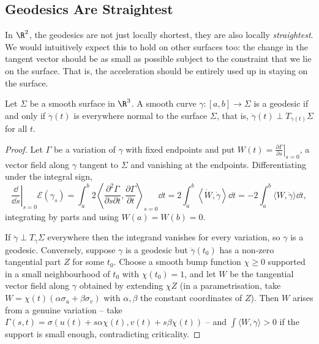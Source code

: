 \subsection{Geodesics Are Straightest}

In $\R^2$, the geodesics are not just locally shortest, they are also locally \emph{straightest}. We would intuitively expect this to hold on other surfaces too: the change in the tangent vector should be as small as possible subject to the constraint that we lie on the surface. That is, the acceleration should be entirely used up in staying on the surface.

\begin{theorem}
    Let $\Sigma$ be a smooth surface in $\R^3$. A smooth curve $\gamma:[a, b] \rightarrow \Sigma$ is a geodesic if and only if $\ddot{\gamma}(t)$ is everywhere normal to the surface $\Sigma$, that is, $\ddot\gamma(t) \perp T_{\gamma(t)}\Sigma$ for all $t$.
\end{theorem}
\begin{proof}
    Let $\Gamma$ be a variation of $\gamma$ with fixed endpoints and put $W(t) = \left.\frac{\partial \Gamma}{\partial s}\right|_{s=0}$, a vector field along $\gamma$ tangent to $\Sigma$ and vanishing at the endpoints. Differentiating under the integral sign,
    $$
    \left.\frac{\dd}{\dd s}\right|_{s=0}\mathcal E(\gamma_s) = \int_a^b 2\left\langle \frac{\partial^2\Gamma}{\partial s \partial t}, \frac{\partial\Gamma}{\partial t}\right\rangle_{s=0} \dd t = 2\int_a^b \left\langle \dot W, \dot\gamma\right\rangle \dd t = -2\int_a^b \langle W, \ddot\gamma\rangle\dd t,
    $$
    integrating by parts and using $W(a) = W(b) = 0$.

    If $\ddot\gamma \perp T_{\gamma}\Sigma$ everywhere then the integrand vanishes for every variation, so $\gamma$ is a geodesic. Conversely, suppose $\gamma$ is a geodesic but $\ddot\gamma(t_0)$ has a non-zero tangential part $Z$ for some $t_0$. Choose a smooth bump function $\chi \geq 0$ supported in a small neighbourhood of $t_0$ with $\chi(t_0) = 1$, and let $W$ be the tangential vector field along $\gamma$ obtained by extending $\chi Z$ (in a parametrisation, take $W = \chi(t)(\alpha\sigma_u + \beta\sigma_v)$ with $\alpha, \beta$ the constant coordinates of $Z$). Then $W$ arises from a genuine variation -- take $\Gamma(s,t) = \sigma(u(t) + s\alpha\chi(t), v(t) + s\beta\chi(t))$ -- and $\int \langle W, \ddot\gamma\rangle > 0$ if the support is small enough, contradicting criticality.
\end{proof}

